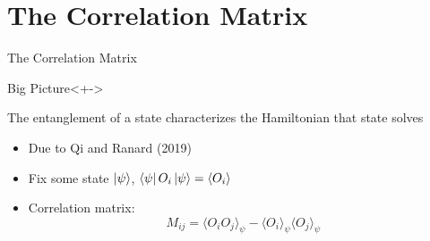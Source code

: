 \documentclass{beamer}
\begin{document}
\section{The Correlation Matrix}
\begin{frame}{The Correlation Matrix}
	\begin{exampleblock}{Big Picture}<+->
		\begin{center}
			The entanglement of a state characterizes the 
			Hamiltonian that state solves 
		\end{center}
	\end{exampleblock}
	\begin{itemize}
	\item<+-> Due to Qi and Ranard (2019)
	\item<+-> Fix some state $ \ket{\psi} $, $ \bra{\psi}O_i\ket{\psi} = \langle O_i \rangle$
	\item<+-> Correlation matrix: 
	\begin{equation*}
		M_{ij} = \langle O_i O_j \rangle_\psi - \langle O_i \rangle_\psi 
			\langle O_j \rangle_\psi
	\end{equation*}
	\end{itemize}
\end{frame}
\end{document}
